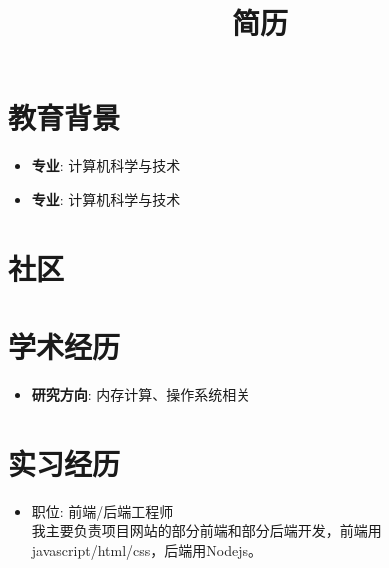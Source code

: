 \documentclass[11pt,a4paper]{moderncv}
\title{简历}               %
\begin{document}
\maketitle

\section{教育背景}
{
\begin{itemize}
\item \textbf{专业}: 计算机科学与技术
\end{itemize}
}


{
\begin{itemize}
\item \textbf{专业}: 计算机科学与技术
\end{itemize}
}




\section{社区}

\section{学术经历}
{
\begin{itemize}
\item \textbf{研究方向}: 内存计算、操作系统相关
\end{itemize}
}

\section{实习经历}
{
\begin{itemize}
\item 职位: 前端/后端工程师\\
我主要负责项目网站的部分前端和部分后端开发，前端用javascript/html/css，后端用Nodejs。
\end{itemize}
}
\end{document}
